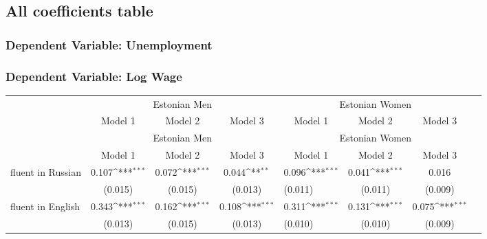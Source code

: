 \subsection{All coefficients table}

\subsubsection{Dependent Variable: Unemployment}
\label{sec:unemployment_full}

\subsubsection{Dependent Variable: Log Wage}
\label{sec:wage_full}

{
	\def\sym#1{\ifmmode^{#1}\else\(^{#1}\)\fi}
	\begin{longtable}{l*{3}{c}|l*{3}{c}}
		\toprule
		& \multicolumn{3}{c}{Estonian Men} & \multicolumn{3}{c}{Estonian Women} \\
				&\multicolumn{1}{c}{Model 1}&\multicolumn{1}{c}{Model 2}&\multicolumn{1}{c}{Model 3}&\multicolumn{1}{c}{Model 1}&\multicolumn{1}{c}{Model 2}&\multicolumn{1}{c}{Model 3}\\
		\endfirsthead
				& \multicolumn{3}{c}{Estonian Men} & \multicolumn{3}{c}{Estonian Women} \\
		&\multicolumn{1}{c}{Model 1}&\multicolumn{1}{c}{Model 2}&\multicolumn{1}{c}{Model 3}&\multicolumn{1}{c}{Model 1}&\multicolumn{1}{c}{Model 2}&\multicolumn{1}{c}{Model 3}\\
		\midrule
		\endhead
		\midrule
		\endfoot
		\endlastfoot
		\midrule
		fluent in Russian   &       0.107\sym{***}&       0.072\sym{***}&       0.044\sym{**} &       0.096\sym{***}&       0.041\sym{***}&       0.016         \\
		&     (0.015)         &     (0.015)         &     (0.013)         &     (0.011)         &     (0.011)         &     (0.009)         \\
		fluent in English   &       0.343\sym{***}&       0.162\sym{***}&       0.108\sym{***}&       0.311\sym{***}&       0.131\sym{***}&       0.075\sym{***}\\
		&     (0.013)         &     (0.015)         &     (0.013)         &     (0.010)         &     (0.010)         &     (0.009)         \\

\end{longtable}}
